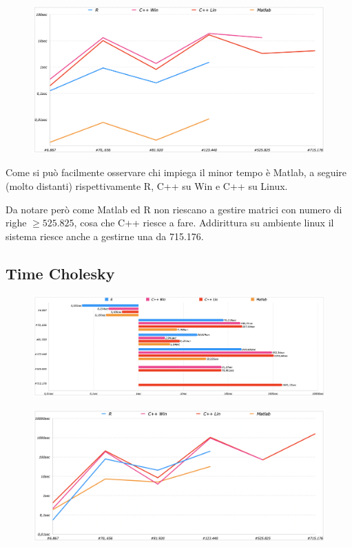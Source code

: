 \documentclass[preprint,12pt]{elsarticle}
\begin{document}
\begin{figure}[H]
	\centering
	\includegraphics[width=\linewidth]{setup2}
\end{figure}

Come si può facilmente osservare chi impiega il minor tempo è Matlab, a seguire (molto distanti) rispettivamente R, C++ su Win e C++ su Linux.


Da notare però come Matlab ed R non riescano a gestire matrici con numero di righe $\geq 525.825$, cosa che C++ riesce a fare. Addirittura su ambiente linux il sistema riesce anche a gestirne una da 715.176.

\subsection{Time Cholesky}

\begin{figure}[H]
	\centering
	\includegraphics[width=\linewidth]{cholesky1}
\end{figure}

\begin{figure}[H]
	\centering
	\includegraphics[width=\linewidth]{cholesky2}
\end{figure}
\end{document}
